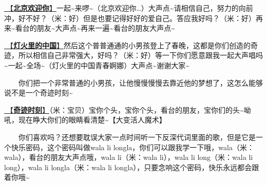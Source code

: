 \documentclass[]{ctexbook}
\begin{document}
\hyperref[welcome-to-beijing]{🎵【\textbf{北京欢迎你}】}一起\textasciitilde 来啰\textasciitilde（北京欢迎你\ldots）大声点\textasciitilde 请相信自己，努力的向前冲，好不好？（米：好）但是也要记得好好的爱自己。答应我好吗？（米：好）再来\textasciitilde 看台的朋友\textasciitilde 大声点\textasciitilde 再来一遍\textasciitilde 看台的朋友大声点\textasciitilde{}

\hyperref[China-in-the-lights]{🎵【\textbf{灯火里的中国}】}然后这个普普通通的小男孩登上了春晚，这都是你们创造的奇迹，所以相信自己非常强大，好吗？（米：好）等一下你们愿意跟我一起大声唱吗\textasciitilde 一起\textasciitilde 全场\textasciitilde（灯火里的中国青春婀娜）大声点\textasciitilde 谢谢大家\textasciitilde{}

  你们把一个非常普通的小男孩，让他慢慢慢慢去靠近他的梦想了，这怎么能够说不是一个奇迹时刻\textasciitilde{}

\hyperref[magic-moment]{🎵【\textbf{奇迹时刻}】}（米：宝贝）宝你个头，宝你个头，看台的朋友，宝你们的头\textasciitilde 呦吼，现在睁大你们的眼睛看清楚\textasciitilde【大变活人魔术】

  你们喜欢吗？还想要耽误大家一点时间听一下反深代词里面的歌，但是它是一个快乐密码，这个密码叫做wala li longla，你们可以跟我学一下哦，wala（米：wala），看台的朋友大声点哦，wala li（米：wala li），wala li long（米：wala li long），wala li longla（米：wala li longla），只要念响这个密码，快乐永远都会跟着你哦\textasciitilde{}
\end{document}
